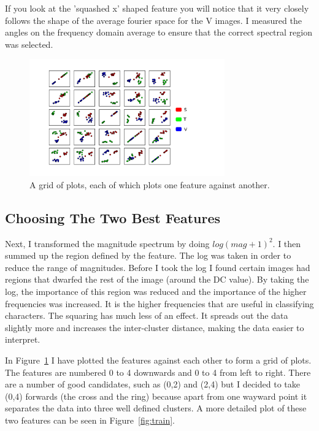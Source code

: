 \documentclass[11pt, a4paper]{article}
\begin{document}
If you look at the 'squashed x' shaped feature you will notice that it very closely follows the shape of the average fourier space for the V images. I measured the angles on the frequency domain average to ensure that the correct spectral region was selected.
\begin{figure}[ht]
	\centering
	\includegraphics[trim={0 1cm 3cm 1.5cm},clip,width=0.75\textwidth]{feature_matrix_leg.png}
	\caption{A grid of plots, each of which plots one feature against another.}
	\label{fig:feature_matrix}
\end{figure}

\subsection{Choosing The Two Best Features}
Next, I transformed the magnitude spectrum by doing \( log( mag + 1 )^2\). I then summed up the region defined by the feature. The log was taken in order to reduce the range of magnitudes. Before I took the log I found certain images had regions that dwarfed the rest of the image (around the DC value). By taking the log, the importance of this region was reduced and the importance of the higher frequencies was increased. It is the higher frequencies that are useful in classifying characters. The squaring has much less of an effect. It spreads out the data slightly more and increases the inter-cluster distance, making the data easier to interpret.

In Figure~\ref{fig:feature_matrix} I have plotted the features against each other to form a grid of plots. The features are numbered 0 to 4 downwards and 0 to 4 from left to right. There are a number of good candidates, such as (0,2) and (2,4) but I decided to take (0,4) forwards (the cross and the ring) because apart from one wayward point it separates the data into three well defined clusters. A more detailed plot of these two features can be seen in Figure~\ref{fig:train}.
\end{document}
